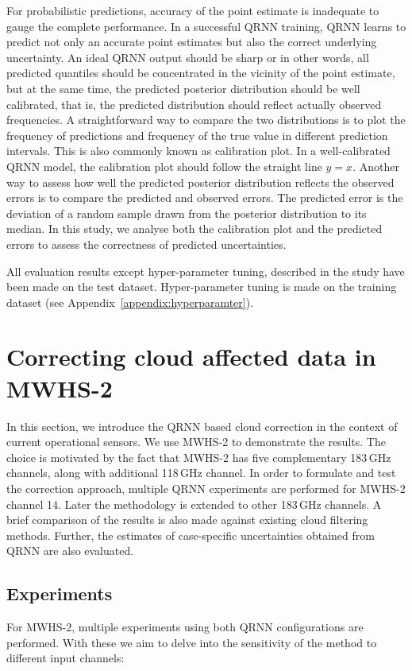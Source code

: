 \documentclass[amt, manuscript]{copernicus}
\begin{document}
For probabilistic predictions, accuracy of the point estimate is inadequate to
gauge the complete performance. In a successful QRNN training, QRNN learns to
predict not only an accurate point estimates but also the correct underlying
uncertainty. An ideal QRNN output should be sharp or in other words, all
predicted quantiles should be concentrated in the vicinity of the point
estimate, but at the same time, the predicted posterior distribution should be
well calibrated, that is, the predicted distribution should reflect actually
observed frequencies. A straightforward way to compare the two distributions is
to plot the frequency of predictions and frequency of the true value in
different prediction intervals. This is also commonly known as calibration plot.
In a well-calibrated QRNN model, the calibration plot should follow the straight
line $y = x$. Another way to assess how well the predicted posterior distribution
reflects the observed errors is to compare the predicted and observed errors.
The predicted error is the deviation of a random sample drawn from the posterior
distribution to its median. In this study, we analyse both the calibration plot
and the predicted errors to assess the correctness of predicted uncertainties.  

All evaluation results except hyper-parameter tuning, described in the study have been made on the test dataset. Hyper-parameter tuning is made on the training dataset (see Appendix~\ref{appendix:hyperparamter}).


\section{Correcting cloud affected data in MWHS-2}
\label{qrnn_mwhs}
%
In this section, we introduce the QRNN based cloud correction in the context of current operational sensors.  We use MWHS-2 to demonstrate the results. The choice is motivated by the fact that MWHS-2 has five complementary 183\,GHz channels, along with additional 118\,GHz channel. In order to formulate and test the correction approach, multiple QRNN experiments are performed for MWHS-2 channel 14. Later the methodology is extended to other 183\,GHz channels. A brief comparison of the results is also made against existing cloud filtering methods. Further, the estimates of case-specific uncertainties obtained from QRNN are also evaluated.

\subsection{Experiments}
%
\label{sec:QRNN_expt_MWHS}
For MWHS-2, multiple experiments using both QRNN configurations are performed. With these we aim to delve into the sensitivity of the method to different input channels:
\end{document}
